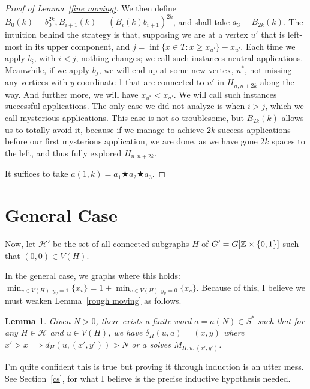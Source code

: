 \documentclass[a4paper]{article}
\newtheorem{lem}[result]{Lemma}
\theoremstyle{definition}
\begin{document}
\begin{proof}[Proof of Lemma~\ref*{fine moving}]
    We then define $B_0(k) = b_0^{2k}, B_{i+1}(k) = (B_i(k)b_{i+1})^{2k}$, and shall take $a_3 = B_{2k}(k)$. The intuition behind the strategy is that, supposing we are at a vertex $u'$ that is left-most in its upper component, and $j=\inf\{x\in T: x\ge x_{u'}\}-x_{u'}$. Each time we apply $b_i$, with $i < j$, nothing changes; we call such instances neutral applications. Meanwhile, if we apply $b_j$, we will end up at some new vertex, $u^*$, not missing any vertices with $y$-coordinate 1 that are connected to $u'$ in $H_{n,n+2k}$ along the way. And further more, we will have $x_{u^*}<x_{u'}$. We will call such instances successful applications. The only case we did not analyze is when $i > j$, which we call mysterious applications. This case is not so troublesome, but $B_{2k}(k)$ allows us to totally avoid it, because if we manage to achieve $2k$ success applications before our first mysterious application, we are done, as we have gone $2k$ spaces to the left, and thus fully explored $H_{n,n+2k}$.
    
    It suffices to take $a(1,k) = a_1\bigstar a_2\bigstar a_3$. 
\end{proof}

\newpage

\section{General Case}

Now, let $\mathcal{H}'$ be the set of all connected subgraphs $H$ of $G' = G[ \Bbb{Z}\times \{0,1\}]$ such that $(0,0) \in V(H)$.

In the general case, we graphs where this holds: $\min_{v \in V(H): y_v = 1} \{x_v\} = 1+\min_{v \in V(H): y_v = 0} \{x_v\}$.  Because of this, I believe we must weaken Lemma~\ref{rough moving} as follows.
\begin{lem}\label{rough moving v2}
    Given $N> 0$, there exists a finite word $a = a(N) \in S^*$ such that for any $H \in \mathcal{H}$ and $u \in V(H)$, we have $\delta_H(u,a) = (x,y)$ where $x' > x \implies d_H(u,(x',y'))> N$ or $a$ solves $M_{H,u,(x',y')}$.
\end{lem}I'm quite confident this is true but proving it through induction is an utter mess. See Section~\ref{cs}, for what I believe is the precise inductive hypothesis needed.
\end{document}
